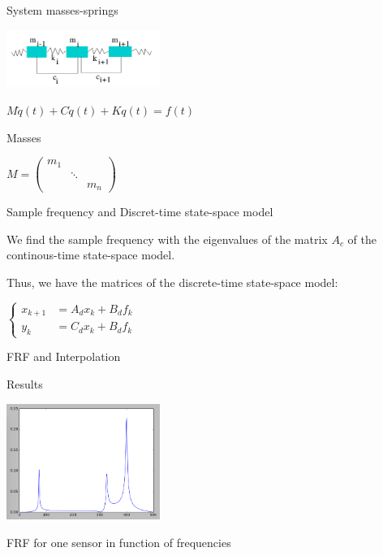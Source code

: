 \documentclass{beamer}
\begin{document}
\begin{frame}{System masses-springs}
\begin{center}
\includegraphics[width=5cm]{images/ressorts.png}

$M \ddot{q}(t) + C \dot{q}(t) + K q(t) = f(t)$
\end{center}


\begin{exampleblock}{Masses}
\begin{center}
$
M = 
\begin{pmatrix} 
m_1\\ 
&\ddots\\ 
&&m_n
\end{pmatrix}
$
\end{center}
\end{exampleblock}

\end{frame}


\begin{frame}{Sample frequency and Discret-time state-space model}

We find the sample frequency with the eigenvalues of the matrix $A_c$ of the continous-time state-space model.

\vspace{5mm}

Thus, we have the matrices of the discrete-time state-space model:
\begin{center}
$\left\{
\begin{array}{ll}
x_{k+1} & = A_dx_k + B_df_k \\
y_k & = C_dx_k + B_df_k
\end{array}
\right.$
\end{center}

\end{frame}

\begin{frame}{FRF and Interpolation}
\end{frame}

\begin{frame}{Results}
\begin{center}
\includegraphics[width=5cm]{images/FRF_freq.png}

FRF for one sensor in function of frequencies
\end{center}
\end{frame}
\end{document}
